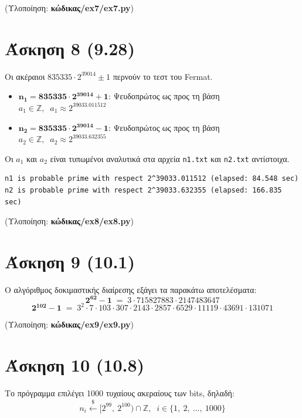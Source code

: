 \documentclass[12pt]{article}
\newcommand{\lt}{\latintext}
\newcommand{\ints}{\mathbb{Z}}
\begin{document}
\vspace{0.1in}
\noindent
(Υλοποίηση: \textbf{κώδικας/{\lt ex7/ex7.py}})


\section*{Άσκηση 8 (9.28)}

Οι ακέραιοι $835335 \cdot 2^{39014} \pm 1$ περνούν το τεστ του {\lt Fermat}.
\begin{itemize}
	\item $\mathbf{n_1 = 835335 \cdot 2^{39014} + 1}$: Ψευδοπρώτος ως προς τη βάση $a_1 \in \ints,\;\; a_1 \approx 2^{39033.011512}$
	\item $\mathbf{n_2 = 835335 \cdot 2^{39014} - 1}$: Ψευδοπρώτος ως προς τη βάση $a_2 \in \ints,\;\; a_2 \approx 2^{39033.632355}$
\end{itemize}
Οι $a_1$ και $a_2$ είναι τυπωμένοι αναλυτικά στα αρχεία \texttt{\lt n1.txt} και \texttt{\lt n2.txt} 
αντίστοιχα.

{ \lt
\begin{verbatim}
n1 is probable prime with respect 2^39033.011512 (elapsed: 84.548 sec)
n2 is probable prime with respect 2^39033.632355 (elapsed: 166.835 sec)
\end{verbatim}
}

\vspace{0.1in}
\noindent
(Υλοποίηση: \textbf{κώδικας/{\lt ex8/ex8.py}})


\section*{Άσκηση 9 (10.1)}
Ο αλγόριθμος δοκιμαστικής διαίρεσης εξάγει τα παρακάτω 
αποτελέσματα:
\[
	\mathbf{2^{62} - 1}\; =\; 3 \cdot 715827883 
	\cdot 2147483647
\]
\[
	\mathbf{2^{102} - 1}\; =\; 3^{2} \cdot 7 \cdot 103 
	\cdot 307 \cdot 2143 \cdot 2857 \cdot 6529 
	\cdot 11119 \cdot 43691 \cdot 131071
\]

\vspace{0.1in}
\noindent
(Υλοποίηση: \textbf{κώδικας/{\lt ex9/ex9.py}})

\pagebreak

\section*{Άσκηση 10 (10.8)}

\noindent
Το πρόγραμμα επιλέγει 1000 τυχαίους ακεραίους των {\lt 100 bits}, δηλαδή:
{ \large
\[
	n_i \xleftarrow{\$} [2^{99},\:2^{100}) \cap \ints,\;\; i \in \{1,\:2,\:...,\:1000\}
\]
}
\end{document}
